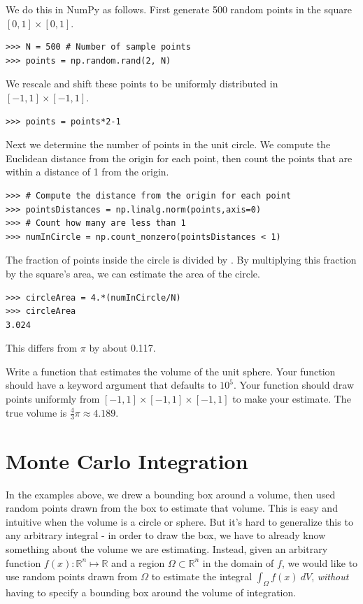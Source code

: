We do this in NumPy as follows. First generate 500 random points in the square $[0,1] \times [0,1]$.
\begin{lstlisting}
>>> N = 500 # Number of sample points
>>> points = np.random.rand(2, N)
\end{lstlisting}
We rescale and shift these points to be uniformly distributed in $[-1,1]\times[-1,1]$.
\begin{lstlisting}
>>> points = points*2-1
\end{lstlisting}
Next we determine the number of points in the unit circle.
We compute the Euclidean distance from the origin for each point, then count the points that are within a distance of 1 from the origin.
\begin{lstlisting}
>>> # Compute the distance from the origin for each point
>>> pointsDistances = np.linalg.norm(points,axis=0)
>>> # Count how many are less than 1
>>> numInCircle = np.count_nonzero(pointsDistances < 1)
\end{lstlisting}
The fraction of points inside the circle is  divided by . By multiplying this fraction by the square's area, we can estimate the area of the circle. 
\begin{lstlisting}
>>> circleArea = 4.*(numInCircle/N)
>>> circleArea
3.024
\end{lstlisting}
This differs from $\pi$ by about 0.117.

\begin{problem}
\label{prob:sphere}
Write a function that estimates the volume of the unit sphere. Your function should have a keyword argument  that defaults to $10^5$. Your function should draw  points uniformly from $[-1,1]\times[-1,1]\times[-1,1]$ to make your estimate. The true volume is $\frac{4}{3}\pi \approx 4.189$.
\end{problem}


\section*{Monte Carlo Integration}

In the examples above, we drew a bounding box around a volume, then used random points drawn from the box to estimate that volume. 
This is easy and intuitive when the volume is a circle or sphere.
But it's hard to generalize this to any arbitrary integral - in order to draw the box, we have to already know something about the volume we are estimating.
Instead, given an arbitrary function $f(x) : \mathbb{R}^n \mapsto \mathbb{R} $ and a region $\Omega \subset \mathbb{R}^n$ in the domain of $f$, we would like to use random points drawn from $\Omega$ to estimate the integral 
$\int_\Omega f(x)\:dV$,
\textit{without} having to specify a bounding box around the volume of integration. 

